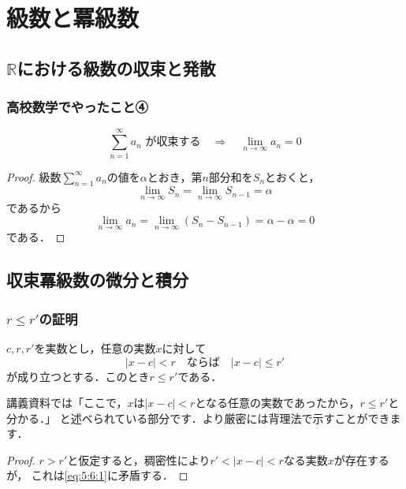\documentclass[./index]{subfiles}
\begin{document}
\section{級数と冪級数}

\subsection{$\mathbb{R}$における級数の収束と発散}
\subsubsection{高校数学でやったこと④}
\begin{screen}
    \begin{proposition}
        \begin{equation}
            \sum_{n = 1}^{\infty} a_n \mbox{ が収束する}
            \quad \Longrightarrow \quad
            \lim_{n \rightarrow \infty} a_n = 0
        \end{equation}
    \end{proposition}
\end{screen}

\begin{proof}
    級数$\sum_{n=1}^\infty a_n$の値を$\alpha$とおき，第$n$部分和を$S_n$とおくと，
    \begin{equation}
        \lim_{n \rightarrow \infty} S_n = \lim_{n \rightarrow \infty} S_{n-1} = \alpha
    \end{equation}
    であるから
    \begin{equation}
        \lim_{n \rightarrow \infty} a_n
        = \lim_{n \rightarrow \infty} (S_n - S_{n-1})
        = \alpha - \alpha
        = 0
    \end{equation}
    である．
\end{proof}

\setcounter{subsection}{5}
\subsection{収束冪級数の微分と積分}
\subsubsection{$r \le r'$の証明}
\begin{screen}
    \begin{proposition}
        $c, r, r'$を実数とし，任意の実数$x$に対して
        \begin{equation}
            \label{eq:5:6:1}
            |x - c| < r \quad \mbox{ならば} \quad |x - c| \le r'
        \end{equation}
        が成り立つとする．このとき$r \le r'$である．
    \end{proposition}
\end{screen}

講義資料では「ここで，$x$は$|x - c| < r$となる任意の実数であったから，$r \le r'$と分かる．」
と述べられている部分です．より厳密には背理法で示すことができます．

\begin{proof}
    $r > r'$と仮定すると，稠密性により$r' < |x - c| < r$なる実数$x$が存在するが，
    これは\cref{eq:5:6:1}に矛盾する．
\end{proof}
\end{document}
